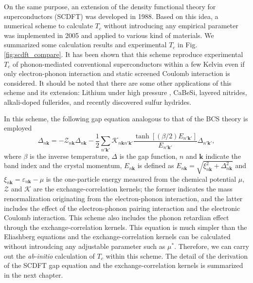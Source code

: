 On the same purpose, an extension of the density functional theory for superconductors (SCDFT)
was developed in 1988\cite{Oliveira1988}. Based on this idea, a numerical scheme to calculate
$T_c$ without introducing any empirical parameter was implemented in 2005\cite{Luders2005} 
and applied to various kind of materials. We summarized some calculation results and experimental 
$T_c$ in Fig.\ref{fig:scdft_compare}. It has been shown that this scheme reproduce experimental $T_c$ 
of phonon-mediated conventional superconductors within a few Kelvin even if only electron-phonon 
interaction and static screened Coulomb interaction is considered.
It should be noted that there are some other applications of this scheme and its extension: 
Lithium under high pressure
\cite{Profeta2006Pressure, RA2013}, CaBeSi\cite{Bersier2009CaBeSi}, layered nitrides\cite{RA2012}, 
alkali-doped fullerides\cite{RA2013alkali}, and recently discovered sulfur hydrides\cite{RA2015}.

In this scheme, the following gap equation analogous to that of the BCS theory is employed
%
\begin{equation}
	\Delta_{n \bm k} = -{\mathcal Z}_{n \bm k}\Delta_{n \bm k} - \frac{1}{2}
	\sum_{n' \bm k'} {\mathcal K}_{n \bm k n' \bm k'} \frac{\tanh[(\beta/2)E_{n' \bm k'}]}
	{E_{n' \bm k'}} \Delta_{n' \bm k'},
	\label{eq:gapeqintro}
\end{equation}
%
where $\beta$ is the inverse temperature, $\Delta$ is the gap function,
$n$ and $\bm k$ indicate the band index and the crystal momentum, 
$E_{n \bm k} $ is defined as $E_{n\bm k} = \sqrt{\xi_{n\bm k}^2 + \Delta_{n \bm k}^2}$ and 
$\xi_{n\bm k} = \varepsilon_{n\bm k} - \mu$ is the one-particle energy measured from the chemical
potential $\mu$, $\mathcal Z$ and $\mathcal K$ are the exchange-correlation kernels; the former
indicates the mass renormalization originating from the electron-phonon interaction, and the latter
includes the effect of the electron-phonon pairing interaction and the electronic Coulomb interaction.
This scheme also includes the phonon retardian effect through the exchange-correlation kernels.
This equation is much simpler than the Eliashberg equations and the exchange-correlation kernels 
can be calculated without introudcing any adjustable parameter such as $\mu^{\ast}$.
Therefore, we can carry out the {\it ab-initio} calculation of $T_c$ within this scheme.
The detail of the derivation of the SCDFT gap equation and the exchange-correlation kernels is 
summarized in the next chapter.

